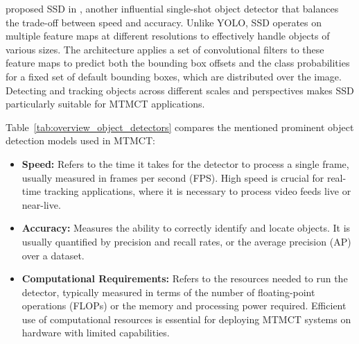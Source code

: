 \citeauthor{Liu15} proposed SSD in \citeyear{Liu15}, another influential single-shot object detector that balances the trade-off between speed and accuracy. Unlike YOLO, SSD operates on multiple feature maps at different resolutions to effectively handle objects of various sizes. The architecture applies a set of convolutional filters to these feature maps to predict both the bounding box offsets and the class probabilities for a fixed set of default bounding boxes, which are distributed over the image. Detecting and tracking objects across different scales and perspectives makes SSD particularly suitable for MTMCT applications.

\begin{table}[ht]
    \centering
    \caption{Overview Object Detectors}\label{tab:overview_object_detectors}
\end{table}

Table~\ref{tab:overview_object_detectors} compares the mentioned prominent object detection models used in MTMCT:

\begin{itemize}
    \item \textbf{Speed:} Refers to the time it takes for the detector to process a single frame, usually measured in frames per second (FPS). High speed is crucial for real-time tracking applications, where it is necessary to process video feeds live or near-live.
    \item \textbf{Accuracy:} Measures the ability to correctly identify and locate objects. It is usually quantified by precision and recall rates, or the average precision (AP) over a dataset.
    \item \textbf{Computational Requirements:} Refers to the resources needed to run the detector, typically measured in terms of the number of floating-point operations (FLOPs) or the memory and processing power required. Efficient use of computational resources is essential for deploying MTMCT systems on hardware with limited capabilities.
\end{itemize}

